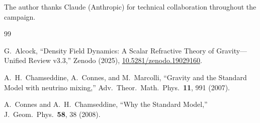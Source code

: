 \documentclass[aps,prd,twocolumn,superscriptaddress,nofootinbib]{revtex4-2}
\begin{document}
The author thanks Claude (Anthropic) for technical
collaboration throughout the campaign.

\begin{thebibliography}{99}

G.~Alcock, ``Density Field Dynamics: A Scalar Refractive
Theory of Gravity---Unified Review v3.3,'' Zenodo (2025),
\href{https://doi.org/10.5281/zenodo.19029160}%
{10.5281/zenodo.19029160}.

A.~H.~Chamseddine, A.~Connes, and M.~Marcolli,
``Gravity and the Standard Model with neutrino mixing,''
Adv.\ Theor.\ Math.\ Phys.\ \textbf{11}, 991 (2007).

A.~Connes and A.~H.~Chamseddine, ``Why the Standard Model,''
J.\ Geom.\ Phys.\ \textbf{58}, 38 (2008).

\end{thebibliography}
\end{document}
